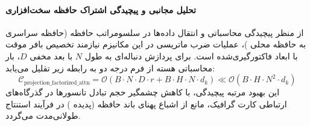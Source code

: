 \paragraph{تحلیل مجانبی و پیچیدگی اشتراک حافظه سخت‌افزاری}
از منظر پیچیدگی محاسباتی و انتقال داده‌ها در سلسومراتب حافظه (حافظه سراسری  به حافظه محلی )، عملیات ضرب ماتریسی در این مکانیزم نیازمند تخصیص بافر موقت با ابعاد فاکتورگیری‌شده است. برای پردازش دنباله‌ای به طول $N$ با بعد مخفی $D$، بار محاسباتی هسته از فرم درجه دو به رابطه زیر تقلیل می‌یابد:
\begin{equation}
\label{eq:complexity_projection_factorized_attn}
\mathcal{C}_{\text{projection\_factorized\_attn}} = \mathcal{O}\left( B \cdot N \cdot D \cdot r + B \cdot H \cdot N \cdot d_k \right) \ll \mathcal{O}\left( B \cdot H \cdot N^2 \cdot d_k \right)
\end{equation}
این بهبود مرتبه پیچیدگی، با کاهش چشمگیر حجم تبادل تانسورها در گذرگاه‌های ارتباطی کارت گرافیک، مانع از اشباع پهنای باند حافظه (پدیده ) در فرآیند استنتاج طولانی‌مدت می‌گردد.